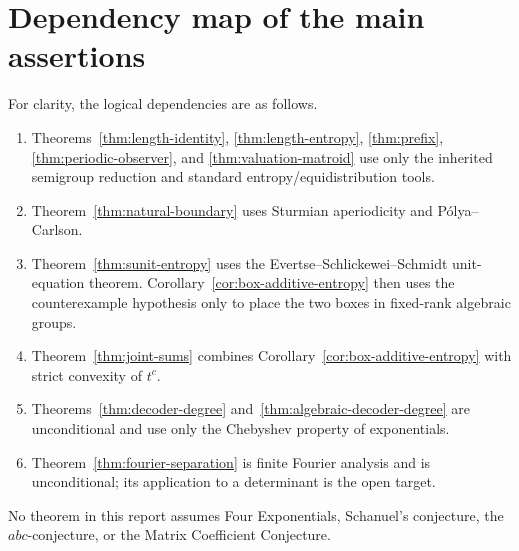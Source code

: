 \documentclass[11pt,oneside]{article}
\theoremstyle{definition}
\theoremstyle{remark}
\begin{document}
\section{Dependency map of the main assertions}\label{app:dependency}

For clarity, the logical dependencies are as follows.
\begin{enumerate}
 \item Theorems~\ref{thm:length-identity}, \ref{thm:length-entropy}, \ref{thm:prefix}, \ref{thm:periodic-observer}, and \ref{thm:valuation-matroid} use only the inherited semigroup reduction and standard entropy/equidistribution tools.
 \item Theorem~\ref{thm:natural-boundary} uses Sturmian aperiodicity and P\'olya--Carlson.
 \item Theorem~\ref{thm:sunit-entropy} uses the Evertse--Schlickewei--Schmidt unit-equation theorem.  Corollary~\ref{cor:box-additive-entropy} then uses the counterexample hypothesis only to place the two boxes in fixed-rank algebraic groups.
 \item Theorem~\ref{thm:joint-sums} combines Corollary~\ref{cor:box-additive-entropy} with strict convexity of \(t^c\).
 \item Theorems~\ref{thm:decoder-degree} and~\ref{thm:algebraic-decoder-degree} are unconditional and use only the Chebyshev property of exponentials.
 \item Theorem~\ref{thm:fourier-separation} is finite Fourier analysis and is unconditional; its application to a determinant is the open target.
\end{enumerate}
No theorem in this report assumes Four Exponentials, Schanuel's conjecture, the \(abc\)-conjecture, or the Matrix Coefficient Conjecture.
\end{document}
